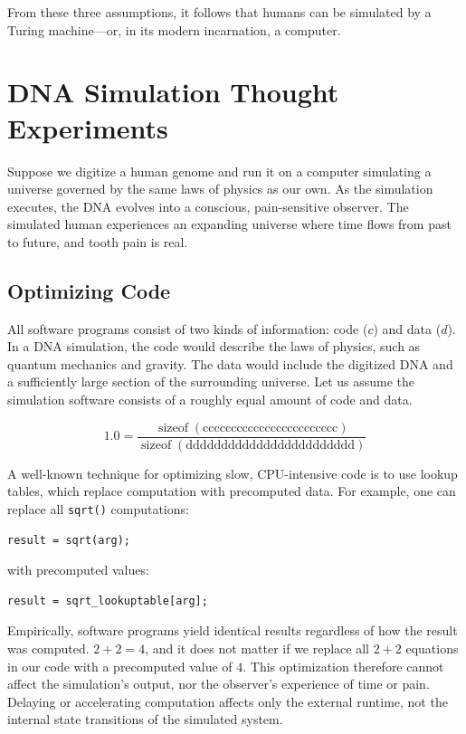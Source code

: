 From these three assumptions, it follows that humans can be simulated by a Turing machine---or, in its modern incarnation, a computer. 


\section{DNA Simulation Thought Experiments}

Suppose we digitize a human genome and run it on a computer simulating a universe governed by the same laws of physics as our own. As the simulation executes, the DNA evolves into a conscious, pain-sensitive observer. The simulated human experiences an expanding universe where time flows from past to future, and tooth pain is real.


\subsection*{Optimizing Code}

All software programs consist of two kinds of information: code ($c$) and data ($d$). In a DNA simulation, the code would describe the laws of physics, such as quantum mechanics and gravity. The data would include the digitized DNA and a sufficiently large section of the surrounding universe. Let us assume the simulation software consists of a roughly equal amount of code and data.

\[
1.0 = \frac{\operatorname{sizeof}(\text{cccccccccccccccccccccccc})}
          {\operatorname{sizeof}(\text{dddddddddddddddddddddddd})}
\]

A well-known technique for optimizing slow, CPU-intensive code is to use lookup tables, which replace computation with precomputed data. For example, one can replace all \texttt{sqrt()} computations:

\begin{verbatim}
result = sqrt(arg);
\end{verbatim}

with precomputed values:

\begin{verbatim}
result = sqrt_lookuptable[arg];
\end{verbatim}

Empirically, software programs yield identical results regardless of how the result was computed. $2+2=4$, and it does not matter if we replace all $2+2$ equations in our code with a precomputed value of $4$. This optimization therefore cannot affect the simulation's output, nor the observer's experience of time or pain. Delaying or accelerating computation affects only the external runtime, not the internal state transitions of the simulated system.

